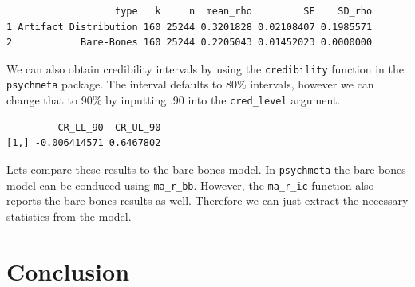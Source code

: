 \documentclass[
  letterpaper,
  DIV=11,
  numbers=noendperiod]{scrreprt}
\newenvironment{Shaded}{}{}
\newcommand{\AttributeTok}[1]{\textcolor[rgb]{0.00,0.34,0.68}{#1}}
\newcommand{\DecValTok}[1]{\textcolor[rgb]{0.69,0.50,0.00}{#1}}
\newcommand{\FunctionTok}[1]{\textcolor[rgb]{0.39,0.29,0.61}{#1}}
\newcommand{\NormalTok}[1]{\textcolor[rgb]{0.12,0.11,0.11}{#1}}
\newcommand{\SpecialCharTok}[1]{\textcolor[rgb]{0.24,0.68,0.91}{#1}}
\newcommand{\StringTok}[1]{\textcolor[rgb]{0.75,0.01,0.01}{#1}}
\begin{document}
\begin{Shaded}
\end{Shaded}

\begin{verbatim}
                   type   k     n  mean_rho         SE    SD_rho
1 Artifact Distribution 160 25244 0.3201828 0.02108407 0.1985571
2            Bare-Bones 160 25244 0.2205043 0.01452023 0.0000000
\end{verbatim}

We can also obtain credibility intervals by using the
\texttt{credibility} function in the \texttt{psychmeta} package. The
interval defaults to 80\% intervals, however we can change that to 90\%
by inputting .90 into the \texttt{cred\_level} argument.

\begin{Shaded}
\end{Shaded}

\begin{verbatim}
         CR_LL_90  CR_UL_90
[1,] -0.006414571 0.6467802
\end{verbatim}

Lets compare these results to the bare-bones model. In
\texttt{psychmeta} the bare-bones model can be conduced using
\texttt{ma\_r\_bb}. However, the \texttt{ma\_r\_ic} function also
reports the bare-bones results as well. Therefore we can just extract
the necessary statistics from the model.

\part{Conclusion}
\end{document}
